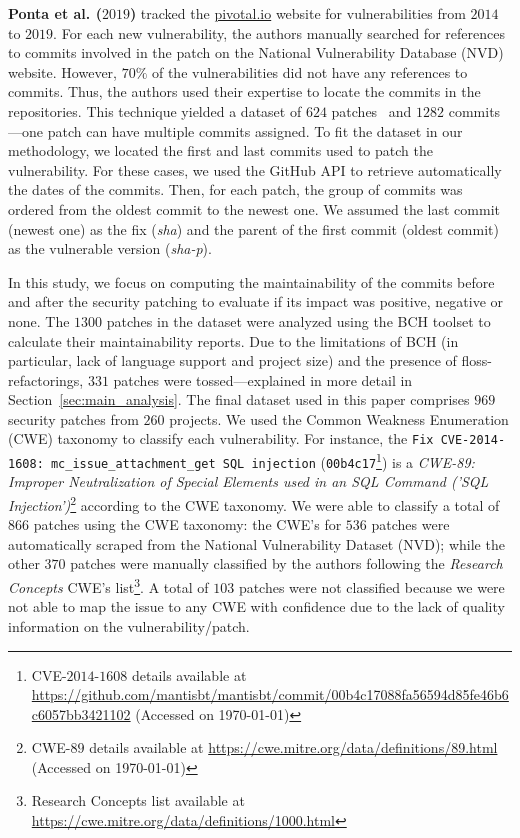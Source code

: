 \documentclass[smallextended]{svjour3}       %
\begin{document}
\textbf{Ponta et al. ($2019$)} tracked the \url{pivotal.io} website for 
vulnerabilities from $2014$ to $2019$. For each new vulnerability, 
the authors manually searched for references to commits involved in 
the patch on the National Vulnerability Database (NVD) website. 
However, $70\%$ of the vulnerabilities did not have any references 
to commits. Thus, the authors used their expertise to locate the 
commits in the repositories. This technique yielded a dataset of 
$624$ patches~\cite{10.1109/MSR.2019.00064} and $1282$ commits---one 
patch can have multiple commits assigned. To fit the dataset in our methodology, we located the 
first and last commits used to patch the vulnerability. For these 
cases, we used the GitHub API to retrieve automatically the dates of 
the commits. Then, for each patch, the group of commits was ordered 
from the oldest commit to the newest one. We assumed the last commit 
(newest one) as the fix (\emph{sha}) and the parent of the 
first commit (oldest commit) as the vulnerable version 
(\emph{sha-p}). 
%

In this study, we focus on computing the maintainability of the 
commits before and after the security patching to evaluate if its 
impact was positive, negative or none. The $1300$ patches in the 
dataset were analyzed using the BCH toolset to calculate their 
maintainability reports. Due to the limitations of BCH (in particular, 
lack of language support and project size) and the presence of
floss-refactorings, $331$ patches were tossed---explained in 
more detail in Section~\ref{sec:main_analysis}.
The final dataset used in this 
paper comprises $969$ security patches from $260$ projects. We used the 
Common Weakness Enumeration (CWE) taxonomy to classify each vulnerability. 
For instance,  the \texttt{Fix CVE-2014-1608: mc\_issue\_attachment\_get SQL injection} 
(\texttt{00b4c17}\footnote{CVE-$2014$-$1608$ details available at 
\url{https://github.com/mantisbt/mantisbt/commit/00b4c17088fa56594d85fe46b6c6057bb3421102} 
(Accessed on \today)}) is a \emph{CWE-89: Improper Neutralization of Special Elements used 
in an SQL Command ('SQL Injection')}\footnote{CWE-$89$ details available at \url{https://cwe.mitre.org/data/definitions/89.html} 
(Accessed on \today)} according to the CWE taxonomy.
We were able to classify a total of $866$ patches using the CWE taxonomy:
the CWE's for $536$ patches were automatically scraped from the National 
Vulnerability Dataset (NVD); while the other $370$ patches were manually classified by 
the authors following the \emph{Research Concepts} CWE's list\footnote{Research Concepts list available at \url{https://cwe.mitre.org/data/definitions/1000.html}}. A total 
of $103$ patches were not classified because we were not able to map
the issue to any CWE with confidence due to the lack of quality
information on the vulnerability/patch.
\end{document}
